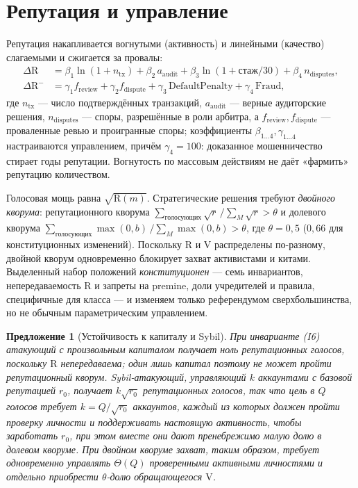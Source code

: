 \documentclass[11pt]{article}
\theoremstyle{plain}
\newtheorem{proposition}{Предложение}
\theoremstyle{definition}
\theoremstyle{remark}
\newcommand{\V}{\mathrm{V}}
\newcommand{\R}{\mathrm{R}}
\begin{document}
\section{Репутация и управление}

Репутация накапливается вогнутыми (активность) и линейными (качество) слагаемыми и сжигается за провалы:
\begin{align}
\Delta \R &= \beta_1 \ln(1 + n_{\mathrm{tx}}) + \beta_2\, a_{\mathrm{audit}} + \beta_3 \ln(1 + \text{стаж}/30) + \beta_4\, n_{\mathrm{disputes}},\\
\Delta \R^{-} &= \gamma_1 f_{\mathrm{review}} + \gamma_2 f_{\mathrm{dispute}} + \gamma_3\, \mathrm{DefaultPenalty} + \gamma_4\, \mathrm{Fraud},
\end{align}
где $n_{\mathrm{tx}}$ --- число подтверждённых транзакций, $a_{\mathrm{audit}}$ --- верные аудиторские решения, $n_{\mathrm{disputes}}$ --- споры, разрешённые в роли арбитра, а $f_{\mathrm{review}}, f_{\mathrm{dispute}}$ --- проваленные ревью и проигранные споры; коэффициенты $\beta_{1\ldots4},\gamma_{1\ldots4}$ настраиваются управлением, причём $\gamma_4 = 100$: доказанное мошенничество стирает годы репутации. Вогнутость по массовым действиям не даёт «фармить» репутацию количеством.

Голосовая мощь равна $\sqrt{\R(m)}$. Стратегические решения требуют \emph{двойного кворума}: репутационного кворума $\sum_{\text{голосующих}}\sqrt{r}\,\big/\sum_{M}\sqrt{r} > \theta$ и долевого кворума $\sum_{\text{голосующих}} \max(0,b) \,\big/ \sum_{M}\max(0,b) > \theta$, где $\theta = 0{,}5$ ($0{,}66$ для конституционных изменений). Поскольку $\R$ и $\V$ распределены по-разному, двойной кворум одновременно блокирует захват активистами и китами. Выделенный набор положений \emph{конституционен} --- семь инвариантов, непередаваемость $\R$ и запреты на premine, доли учредителей и правила, специфичные для класса --- и изменяем только референдумом сверхбольшинства, но не обычным параметрическим управлением.

\begin{proposition}[Устойчивость к капиталу и Sybil]\label{prop:sybil}
При инварианте (I6) атакующий с произвольным капиталом получает ноль репутационных голосов, поскольку $\R$ непередаваема; один лишь капитал поэтому не может пройти репутационный кворум. Sybil-атакующий, управляющий $k$ аккаунтами с базовой репутацией $r_0$, получает $k\sqrt{r_0}$ репутационных голосов, так что цель в $Q$ голосов требует $k=Q/\sqrt{r_0}$ аккаунтов, каждый из которых должен пройти проверку личности и поддерживать настоящую активность, чтобы заработать $r_0$, при этом вместе они дают пренебрежимо малую долю в долевом кворуме. При двойном кворуме захват, таким образом, требует одновременно управлять $\Theta(Q)$ проверенными активными личностями и отдельно приобрести $\theta$-долю обращающегося $\V$.
\end{proposition}
\end{document}
